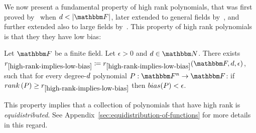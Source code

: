 We now present a fundamental property of high rank polynomials, that was first proved by~\cite{green2007distribution} when $\degree < \abs{\basefield}$,
later extended to general fields by~\cite{kaufman2008worst}, and further extended also to large fields by~\cite{DBLP:journals/corr/0001L15}.
This property of high rank polynomials is that they they have low bias:
\begin{theorem}\label{high-rank-implies-low-bias}
    Let $\basefield$ be a finite field.
    Let $\epsilon > 0$ and $\degree \in \naturalnumbersset$.
    There exists $r_{\ref{high-rank-implies-low-bias}} \definedas r_{\ref{high-rank-implies-low-bias}}(\basefield, \degree, \epsilon)$,
    such that for every degree-$d$ polynomial $\funcdef{\genpoly}{\field}{\basefield}$:
    if $\rank{\genpoly} \geq r_{\ref{high-rank-implies-low-bias}}$ then $\bias{\genpoly} < \epsilon$.
\end{theorem}
\begin{remark}
    This property implies that a collection of polynomials that have high rank is \emph{equidistributed}.
    See Appendix~\ref{sec:equidistribution-of-functions} for more details in this regard.
\end{remark}

%
%
%


